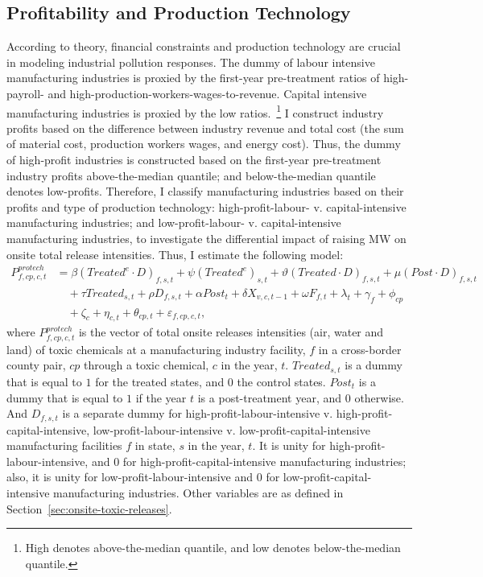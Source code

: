 \documentclass[12pt, english]{article}
\begin{document}
    \subsection{Profitability and Production Technology}\label{subsec:profitability-and-production-technology}
    According to theory, financial constraints and production technology are crucial in modeling industrial pollution responses. The dummy of labour intensive manufacturing industries is proxied by the first-year pre-treatment ratios of high-payroll- and high-production-workers-wages-to-revenue. Capital intensive manufacturing industries is proxied by the low ratios.~\footnote{High denotes above-the-median quantile, and low denotes below-the-median quantile.} I construct industry profits based on the difference between industry revenue and total cost (the sum of material cost, production workers wages, and energy cost). Thus, the dummy of high-profit industries is constructed based on the first-year pre-treatment industry profits above-the-median quantile; and below-the-median quantile denotes low-profits. Therefore, I classify manufacturing industries based on their profits and type of production technology: high-profit-labour- v. capital-intensive manufacturing industries; and low-profit-labour- v. capital-intensive manufacturing industries, to investigate the differential impact of raising MW on onsite total release intensities. Thus, I estimate the following model:
    \begin{align}
        P_{f,cp,c,t}^{protech} &= \beta (Treated^{e} \cdot D)_{f,s,t} + \psi (Treated^{e})_{s,t} + \vartheta (Treated \cdot D)_{f,s,t} + \mu (Post \cdot D)_{f,s,t} \nonumber \\
        &\quad + \tau Treated_{s,t} + \rho D_{f,s,t} + \alpha Post_{t} + \delta X_{v,c,t-1} + \omega F_{f,t} + \lambda_{t} + \gamma_{f} + \phi_{cp} \nonumber \\
        &\quad + \zeta_{c} + \eta_{c,t} + \theta_{cp,t} + \varepsilon_{f,cp,c,t},\label{eq:heterogeneous-onsite-releases-intensity-protech}
    \end{align}
    where $P_{f,cp,c,t}^{protech}$ is the vector of total onsite releases intensities (air, water and land) of toxic chemicals at a manufacturing industry facility, $f$ in a cross-border county pair, $cp$ through a toxic chemical, $c$ in the year, $t$. $Treated_{s,t}$ is a dummy that is equal to $1$ for the treated states, and $0$ the control states. $Post_{t}$ is a dummy that is equal to $1$ if the year $t$ is a post-treatment year, and $0$ otherwise. And $D_{f,s,t}$ is a separate dummy for high-profit-labour-intensive v. high-profit-capital-intensive, low-profit-labour-intensive v. low-profit-capital-intensive manufacturing facilities $f$ in state, $s$ in the year, $t$. It is unity for high-profit-labour-intensive, and $0$ for high-profit-capital-intensive manufacturing industries; also, it is unity for low-profit-labour-intensive and $0$ for low-profit-capital-intensive manufacturing industries. Other variables are as defined in Section~\ref{sec:onsite-toxic-releases}.
\end{document}
